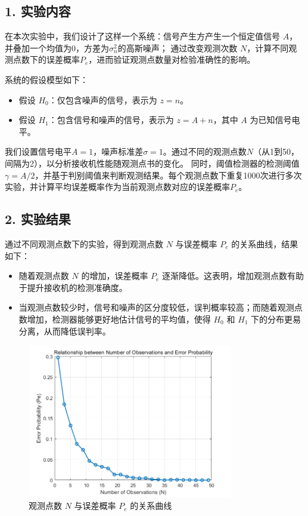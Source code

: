 \documentclass[12pt]{ctexart}
\begin{document}
\subsection*{1. 实验内容}

在本次实验中，我们设计了这样一个系统：信号产生方产生一个恒定值信号 \( A \)，并叠加一个均值为0，方差为\(\sigma_n^2\)的高斯噪声；
通过改变观测次数 \( N \)，计算不同观测点数下的误差概率\(P_e\)，进而验证观测点数量对检验准确性的影响。

系统的假设模型如下：

\begin{itemize}
    \item 假设 \( H_0 \)：仅包含噪声的信号，表示为 \( z = n \)。
    \item 假设 \( H_1 \)：包含信号和噪声的信号，表示为 \( z = A + n \)，其中 \( A \) 为已知信号电平。
\end{itemize}

我们设置信号电平\(A=1\)，噪声标准差\(\sigma = 1\)。通过不同的观测点数\(N\)（从1到50，间隔为2），以分析接收机性能随观测点书的变化。
同时，阈值检测器的检测阈值\(\gamma = A/2\)，并基于判别阈值来判断观测结果。每个观测点数下重复1000次进行多次实验，并计算平均误差概率作为当前观测点数对应的误差概率\(P_e\)。

\subsection*{2. 实验结果}

通过不同观测点数下的实验，得到观测点数 \( N \) 与误差概率 \( P_e \) 的关系曲线，结果如下：

\begin{itemize}
    \item 随着观测点数 \( N \) 的增加，误差概率 \( P_e \) 逐渐降低。这表明，增加观测点数有助于提升接收机的检测准确度。
    \item 当观测点数较少时，信号和噪声的区分度较低，误判概率较高；而随着观测点数增加，检测器能够更好地估计信号的平均值，使得 \( H_0 \) 和 \( H_1 \) 下的分布更易分离，从而降低误判率。
\end{itemize}

\begin{figure}[H]
    \centering
    \includegraphics[width=0.8\textwidth]{image/output3.png}
    \caption{观测点数 \( N \) 与误差概率 \( P_e \) 的关系曲线}
\end{figure}
\end{document}
